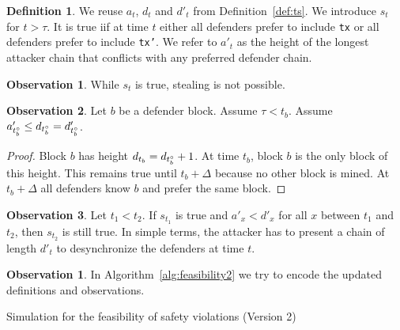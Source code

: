 \documentclass[12pt]{article}
\theoremstyle{definition}
\newtheorem{definition}{Definition}
\newtheorem{observation}{Observation}
\newtheorem{simulation}{Observation}
\begin{document}
\begin{definition} \label{def:ts2}
  We reuse $a_t$, $d_t$ and $d'_t$ from Definition~\ref{def:ts}.
  We introduce $s_t$ for $t > \tau$.
  It is true iif at time $t$ either all defenders prefer to include \texttt{tx} or all defenders prefer to include \texttt{tx'}.
  We refer to $a'_t$ as the height of the longest attacker chain that conflicts with any preferred defender chain.
\end{definition}

\begin{observation}
  While $s_t$ is true, stealing is not possible.
\end{observation}

\begin{observation}
  Let $b$ be a defender block.
  Assume $\tau < t_b$.
  Assume $a'_{t_b^{\circ}} \leq d_{t_b^{\circ}} = d'_{t_b^{\circ}}$.

  \begin{proof}
    Block $b$ has height $d_{t_b} = d_{t_b^{\circ}} + 1$.
    At time $t_b$, block $b$ is the only block of this height.
    This remains true until $t_b + \Delta$ because no other block is mined.
    At $t_b + \Delta$ all defenders know $b$ and prefer the same block.
  \end{proof}
\end{observation}

\begin{observation}
  Let $t_1 < t_2$.
  If $s_{t_1}$ is true and $a'_{x} < d'_{x}$ for all $x$ between $t_1$ and $t_2$, then $s_{t_2}$ is still true.
  In simple terms, the attacker has to present a chain of length $d'_t$ to desynchronize the defenders at time $t$.
\end{observation}

\begin{simulation}
  In Algorithm~\ref{alg:feasibility2} we try to encode the updated definitions and observations.
\end{simulation}

\begin{algorithm}
  \caption{Simulation for the feasibility of safety violations (Version 2)}
  \label{alg:feasibility2}

\end{algorithm}


\end{document}
